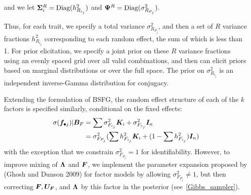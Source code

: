 \documentclass[11pt]{amsart}
\newcommand*{\B}[1]{\ifmmode\bm{#1}\else\textbf{#1}\fi}
\begin{document}
\noindent and we let $\B{\Sigma}^R_i = \mbox{Diag}(h^2_{R_{i_j}})$ and $\B{\Psi}^R = \mbox{Diag}(\sigma^2_{R_{P_j}})$.

Thus, for each trait, we specify a total variance $\sigma^2_{R_{P_j}}$, and then a set of $R$ variance fractions $h^2_{R_{i_j}}$ corresponding to each random effect, the sum of which is less than 1. For prior elicitation, we specify a joint prior on these $R$ variance fractions using an evenly spaced grid over all valid combinations, and then can elicit priors based on marginal distributions or over the full space. The prior on $\sigma^2_{R_{i_j}}$ is an independent inverse-Gamma distribution for conjugacy. 

Extending the formulation of BSFG, the random effect structure of each of the $k$ factors is specified similarly, conditional on the fixed effects:
\begin{align} \begin{split}
\sigma(\B{f}_{\bullet j} ) | \B{B}_F &= \sum \sigma^2_{F_{i_j}} \B{K}_i + \sigma^2_{F_{e_j}}\B{I}_n \\
&= \sigma^2_{F_{P_j}} (\sum h^2_{F_{i_j}} \B{K}_i + (1 - \sum h^2_{F_{i_j}})\B{I}_n) 
\end{split} \end{align}
\noindent with the exception that we constrain $\sigma^2_{F_{P_j}} = 1$ for identifiability. However, to improve mixing of $\B{\Lambda}$ and $\B{F}$, we implement the parameter expansion proposed by (Ghosh and Dunson 2009) for factor models by allowing $\sigma^2_{F_{P_j}} \neq1$, but then correcting $\B{F}, \B{U_F}$, and $\B{\Lambda}$ by this factor in the posterior (see~\ref{Gibbs_sampler}).
\end{document}
